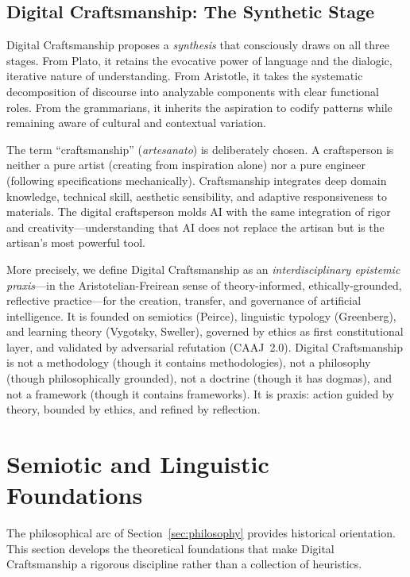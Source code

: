 \documentclass[11pt,a4paper]{article}
\begin{document}
\subsection{Digital Craftsmanship: The Synthetic Stage}

Digital Craftsmanship proposes a \emph{synthesis} that consciously draws on all three stages. From Plato, it retains the evocative power of language and the dialogic, iterative nature of understanding. From Aristotle, it takes the systematic decomposition of discourse into analyzable components with clear functional roles. From the grammarians, it inherits the aspiration to codify patterns while remaining aware of cultural and contextual variation.

The term ``craftsmanship'' (\emph{artesanato}) is deliberately chosen. A craftsperson is neither a pure artist (creating from inspiration alone) nor a pure engineer (following specifications mechanically). Craftsmanship integrates deep domain knowledge, technical skill, aesthetic sensibility, and adaptive responsiveness to materials. The digital craftsperson molds AI with the same integration of rigor and creativity---understanding that AI does not replace the artisan but is the artisan's most powerful tool.

More precisely, we define Digital Craftsmanship as an \emph{interdisciplinary epistemic praxis}---in the Aristotelian-Freirean sense of theory-informed, ethically-grounded, reflective practice---for the creation, transfer, and governance of artificial intelligence. It is founded on semiotics (Peirce), linguistic typology (Greenberg), and learning theory (Vygotsky, Sweller), governed by ethics as first constitutional layer, and validated by adversarial refutation (CAAJ~2.0). Digital Craftsmanship is not a methodology (though it contains methodologies), not a philosophy (though philosophically grounded), not a doctrine (though it has dogmas), and not a framework (though it contains frameworks). It is praxis: action guided by theory, bounded by ethics, and refined by reflection.

\section{Semiotic and Linguistic Foundations}
\label{sec:semiotics}

The philosophical arc of Section~\ref{sec:philosophy} provides historical orientation. This section develops the theoretical foundations that make Digital Craftsmanship a rigorous discipline rather than a collection of heuristics.
\end{document}
